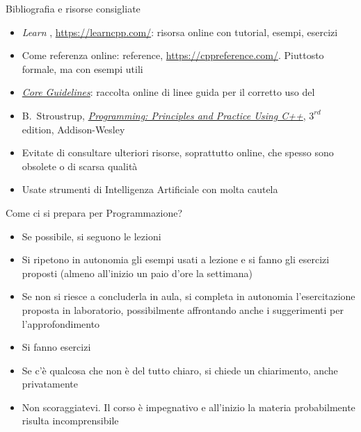 \begin{frame}{Bibliografia e risorse consigliate}

  \begin{itemize}

  \item \textit{Learn \Cpp{}}, \url{https://learncpp.com/}: risorsa online con
    tutorial, esempi, esercizi

  \item Come referenza online: \Cpp{} reference,
    \url{https://cppreference.com/}. Piuttosto formale, ma con esempi utili

  \item
    \href{https://isocpp.github.io/CppCoreGuidelines/CppCoreGuidelines}{\textit{\Cpp{}
        Core Guidelines}}: raccolta online di linee guida per il corretto uso
    del \Cpp{}

  \item B.~Stroustrup,
    \href{https://stroustrup.com/programming.html}{\textit{Programming:
        Principles and Practice Using C++}}, $3^{rd}$ edition, Addison-Wesley

  \end{itemize}

  \begin{itemize}
  \item Evitate di consultare ulteriori risorse, soprattutto online, che spesso
    sono obsolete o di scarsa qualità
  \item Usate strumenti di Intelligenza Artificiale con molta cautela
  \end{itemize}

\end{frame}

\begin{frame}{Come ci si prepara per Programmazione?}

  \begin{itemize}
  \item Se possibile, si seguono le lezioni
  \item Si ripetono in autonomia gli esempi usati a lezione e si fanno gli
    esercizi proposti (almeno all'inizio un paio d'ore la settimana)
  \item Se non si riesce a concluderla in aula, si completa in
    autonomia l'esercitazione proposta in laboratorio, possibilmente
    affrontando anche i suggerimenti per l'approfondimento
  \item Si fanno esercizi
  \item Se c'è qualcosa che non è del tutto chiaro, si chiede un
    chiarimento, anche privatamente
  \item Non scoraggiatevi. Il corso è impegnativo e all'inizio la materia
    probabilmente risulta incomprensibile
  \end{itemize}

\end{frame}

